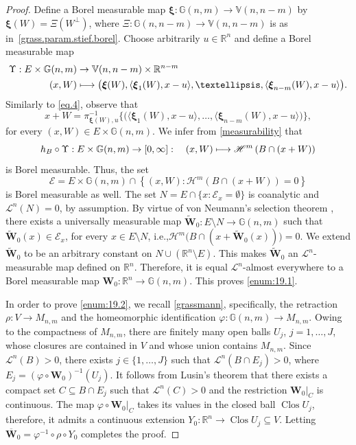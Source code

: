 \documentclass[11pt]{article}
\newcommand{\ie}{i.e.,\xspace}
\theoremstyle{definition}
\theoremstyle{jepanonymous}
\theoremstyle{plain}
\newcommand\mto{\mathchoice{\longmapsto}{\mapsto}{\mapsto}{\mapsto}}
\newcommand{\R}{\mathbb{R}}
\newcommand{\Rn}{\R^n}
\newcommand{\calE}{\mathscr{E}}
\newcommand{\calH}{\mathscr{H}}
\newcommand{\calL}{\mathscr{L}}
\newcommand{\bxi}{\boldsymbol{\xi}}
\newcommand{\bW}{{\boldsymbol{W}}}
\newcommand{\bV}{\mathbb{V}}
\newcommand{\bG}{\mathbb{G}}
\let\bY Y
\DeclareMathOperator{\rmClos}{\mathrm{Clos}}
\let\vphi\varphi
\let\la\langle
\let\ra\rangle
\let\subset\subseteq
\begin{document}
\begin{proof}
Define a Borel measurable map $\bxi: \bG(n,m) \to \bV(n,n-m)$ by $\bxi(W) = \Xi \left(W^\perp \right)$, where $\Xi: \bG(n,n-m) \to \bV(n,n-m)$ is as in~\ref{grass.param.stief.borel}.
Choose arbitrarily $u \in \Rn$ and define a Borel measurable map
\begin{align*}
\Upsilon: E \times \bG(n,m) &\to \bV(n,n-m) \times \R^{n-m} \\
(x,W) &\mto \bigl(\bxi(W), \la \bxi_1(W),x-u \ra, \ldots, \la \bxi_{n-m}(W),x-u \ra \bigr).
\end{align*}
Similarly to \eqref{eq.4}, observe that
\begin{equation*}
x+W = \pi_{\bxi(W),u}^{-1} \bigl\{ \bigl(\la \bxi_1(W),x-u \ra, \ldots, \la \bxi_{n-m}(W),x-u \ra \bigr) \bigr\},
\end{equation*}
for every $(x,W) \in E \times \bG(n,m)$.
We infer from \ref{measurability} that
\begin{equation*}
h_{B} \circ \Upsilon:E \times \bG(n,m) \to [0,\infty]:\quad(x,W) \mto \calH^m \left(B \cap (x+W) \right)
\end{equation*}
is Borel measurable.
Thus, the set
\begin{equation*}
\calE = E \times \bG(n,m) \cap \left\{ (x,W): \calH^m \left(B \cap (x+W) \right) = 0 \right\}
\end{equation*}
is Borel measurable as well.
The set $N = E \cap \{ x: \calE_x = \emptyset \}$ is coanalytic and $\calL^n(N)=0$, by assumption.
By virtue of von Neumann's selection theorem \cite[5.5.3]{SRIVASTAVA}, there exists a universally measurable map $\tilde{\bW}_0: E \setminus N \to \bG(n,m)$ such that $\tilde{\bW}_0(x) \in \calE_x$, for every $x \in E \setminus N$, \ie $\calH^m \bigl(B \cap(x + \tilde{\bW}_0(x))\bigl) = 0$.
We extend $\tilde{\bW}_0$ to be an arbitrary constant on $N \cup (\Rn \setminus E)$.
This makes $\tilde{\bW}_0$ an $\calL^n$-measurable map defined on $\Rn$.
Therefore, it is equal $\calL^n$-almost everywhere to a Borel measurable map $\bW_0: \Rn \to \bG(n,m)$.
This proves \eqref{enum:19.1}.
\par
In order to prove \eqref{enum:19.2}, we recall \ref{grassmann}, specifically, the retraction $\rho: V \to M_{n,m}$ and the homeomorphic identification $\vphi: \bG(n,m) \to M_{n,m}$.
Owing to the compactness of $M_{n,m}$, there are finitely many open balls $U_j$, $j=1,\ldots,J$, whose closures are contained in $V$ and whose union contains $M_{n,m}$.
Since $\calL^n(B) > 0$, there exists $j \in \{1,\ldots,J\}$ such that $\calL^n \left(B \cap E_j \right) > 0$, where $E_j = \left(\vphi \circ \bW_0 \right)^{-1}(U_j)$.
It follows from Lusin's theorem \cite[2.5.3]{GMT} that there exists a compact set $C \subset B \cap E_j$ such that $\calL^n(C) > 0$ and the restriction $\bW_0|_C$ is continuous.
The map $\vphi \circ \bW_0|_C$ takes its values in the closed ball $\rmClos U_j$, therefore, it admits a continuous extension $\bY_0: \Rn \to \rmClos U_j \subset V$.
Letting $\overline{\bW}_0 = \vphi^{-1} \circ \rho \circ \bY_0$ completes the proof.
\end{proof}
\end{document}
